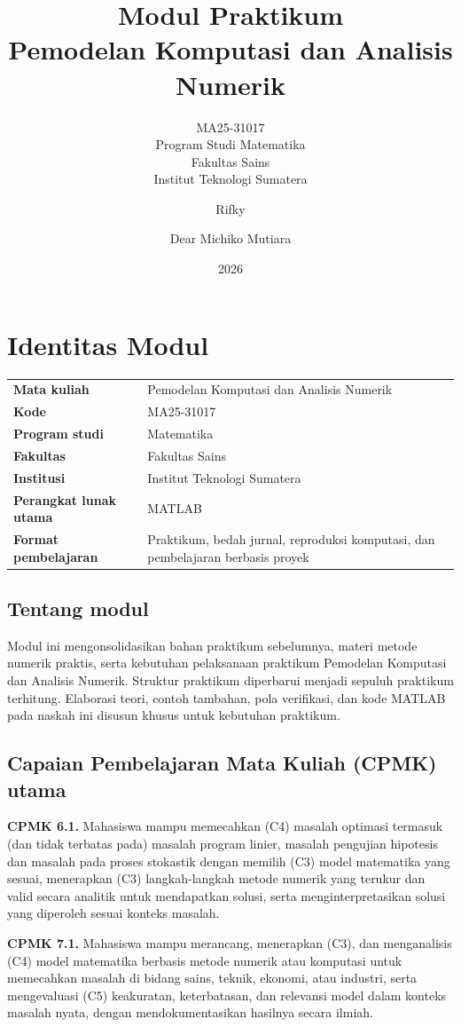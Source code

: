 \documentclass[book,english,noindex,lean,nobackpage,nocopyright,noupdate,nofiglist,notablist]{enacom}
\title{Modul Praktikum\\Pemodelan Komputasi dan Analisis Numerik}
\subtitle{MA25-31017\\Program Studi Matematika\\Fakultas Sains\\Institut Teknologi Sumatera}
\author{Rifky}{Fauzi}
\author{Dear Michiko Mutiara}{Noor}
\date{2026}
\begin{document}
\chapter*{Identitas Modul}
\begin{tabularx}{\textwidth}{>{\bfseries}p{}X}
Mata kuliah & Pemodelan Komputasi dan Analisis Numerik\\
Kode & MA25-31017\\
Program studi & Matematika\\
Fakultas & Fakultas Sains\\
Institusi & Institut Teknologi Sumatera\\
Perangkat lunak utama & MATLAB\\
Format pembelajaran & Praktikum, bedah jurnal, reproduksi komputasi, dan pembelajaran berbasis proyek\\
\end{tabularx}

\section*{Tentang modul}
Modul ini mengonsolidasikan bahan praktikum sebelumnya, materi metode numerik praktis, serta kebutuhan pelaksanaan praktikum Pemodelan Komputasi dan Analisis Numerik. Struktur praktikum diperbarui menjadi sepuluh praktikum terhitung. Elaborasi teori, contoh tambahan, pola verifikasi, dan kode MATLAB pada naskah ini disusun khusus untuk kebutuhan praktikum.

\section*{Capaian Pembelajaran Mata Kuliah (CPMK) utama}
\textbf{CPMK 6.1.} Mahasiswa mampu memecahkan (C4) masalah optimasi termasuk (dan tidak terbatas pada) masalah program linier, masalah pengujian hipotesis dan masalah pada proses stokastik dengan memilih (C3) model matematika yang sesuai, menerapkan (C3) langkah-langkah metode numerik yang terukur dan valid secara analitik untuk mendapatkan solusi, serta menginterpretasikan solusi yang diperoleh sesuai konteks masalah.

\textbf{CPMK 7.1.} Mahasiswa mampu merancang, menerapkan (C3), dan menganalisis (C4) model matematika berbasis metode numerik atau komputasi untuk memecahkan masalah di bidang sains, teknik, ekonomi, atau industri, serta mengevaluasi (C5) keakuratan, keterbatasan, dan relevansi model dalam konteks masalah nyata, dengan mendokumentasikan hasilnya secara ilmiah.
\end{document}
